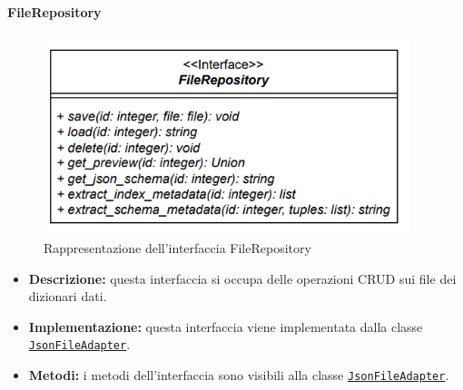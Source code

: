 \paragraph{FileRepository} \label{FileRepository}
\begin{figure}[H]
    \centering
    \includegraphics[width=0.95\textwidth]{assets/Backend/file_repository.png}
    \caption{Rappresentazione dell'interfaccia FileRepository}
  \end{figure}
\begin{itemize}
    \item \textbf{Descrizione:} questa interfaccia si occupa delle operazioni CRUD sui file dei dizionari dati.
    \item \textbf{Implementazione:} questa interfaccia viene implementata dalla classe \hyperref[JsonFileAdapter]{\texttt{JsonFileAdapter}}.
    \item \textbf{Metodi:} i metodi dell'interfaccia sono visibili alla classe \hyperref[JsonFileAdapter]{\texttt{JsonFileAdapter}}.
\end{itemize} 
